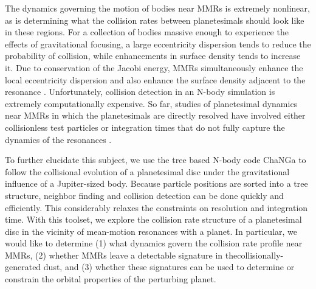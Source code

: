 The dynamics governing the motion of bodies near MMRs is extremely nonlinear, as is determining what the collision rates 
between planetesimals should look like in these regions. For a collection of bodies massive enough to experience the effects of 
gravitational focusing, a large eccentricity dispersion tends to reduce the probability of collision, while enhancements in surface 
density tends to increase it. Due to conservation of the Jacobi energy, MMRs simultaneously enhance the local eccentricity 
dispersion and also enhance the surface density adjacent to the resonance \cite{richardson00, boley17}. Unfortunately, collision 
detection in an N-body simulation is extremely computationally expensive. So far, studies of planetesimal dynamics near MMRs 
in which the planetesimals are directly resolved have involved either collisionless test particles 
\cite{boley17, tabeshian16, tabeshian18} or integration times that do not fully capture the dynamics of the resonances 
\cite{richardson00, dobinson13}.

To further elucidate this subject, we use the tree based N-body code {\sc ChaNGa} \cite{jetley08, menon15} to follow the 
collisional evolution of a planetesimal disc under the gravitational influence of a Jupiter-sized body. Because particle positions 
are sorted into a tree structure, neighbor finding and collision detection can be done quickly and efficiently. This considerably 
relaxes the constraints on resolution and integration time. With this toolset, we explore the collision rate structure of a 
planetesimal disc in the vicinity of mean-motion resonances with a planet. In particular, we would like to determine (1) what 
dynamics govern the collision rate profile near MMRs, (2) whether MMRs leave a detectable signature in thecollisionally-
generated dust, and (3) whether these signatures can be used to determine or constrain the orbital properties of the perturbing 
planet.

